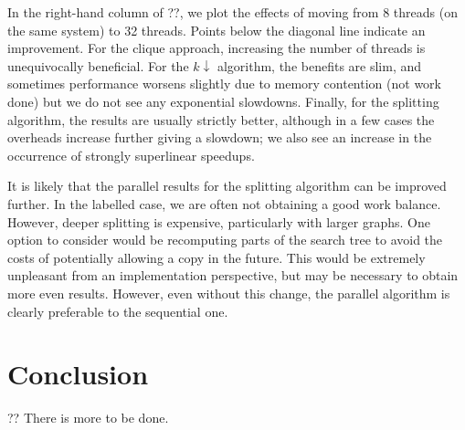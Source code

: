 \documentclass[sigconf]{acmart}
\begin{document}
In the right-hand column of ??, we plot the effects of moving from 8
threads (on the same system) to 32 threads. Points below the diagonal line indicate an improvement.
For the clique approach, increasing the number of threads is unequivocally beneficial. For the
$k{\downarrow}$ algorithm, the benefits are slim, and sometimes performance worsens slightly due to
memory contention (not work done) but we do not see any exponential slowdowns. Finally, for the
splitting algorithm, the results are usually strictly better, although in a few cases the overheads
increase further giving a slowdown; we also see an increase in the occurrence of strongly
superlinear speedups.

It is likely that the parallel results for the splitting algorithm can be improved further. In the
labelled case, we are often not obtaining a good work balance. However, deeper splitting is
expensive, particularly with larger graphs. One option to consider would be recomputing parts of the
search tree to avoid the costs of potentially allowing a copy in the future. This would be extremely
unpleasant from an implementation perspective, but may be necessary to obtain more even results.
However, even without this change, the parallel algorithm is clearly preferable to the sequential
one.

\section{Conclusion}

?? There is more to be done.

\FloatBarrier



\end{document}
